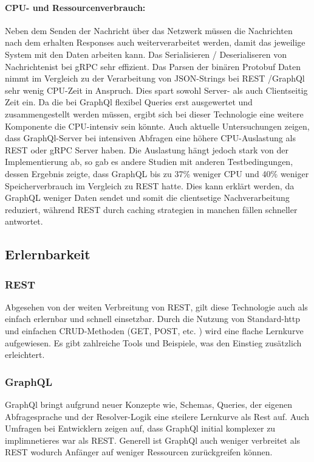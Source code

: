 \paragraph{CPU- und Ressourcenverbrauch:}  
Neben dem Senden der Nachricht über das Netzwerk müssen die Nachrichten nach dem erhalten Responses auch weiterverarbeitet werden, damit das jeweilige System mit den Daten arbeiten kann. Das Serialisieren / Deserialiseren von Nachrichtenist bei gRPC sehr effizient. Das Parsen der binären Protobuf Daten nimmt im Vergleich zu der Verarbeitung von JSON-Strings bei REST /GraphQl sehr wenig CPU-Zeit in Anspruch. Dies spart sowohl Server- als auch Clientseitig Zeit ein. Da die bei GraphQl flexibel Queries erst ausgewertet und zusammengestellt werden müssen,  ergibt sich bei dieser Technologie eine weitere Komponente die CPU-intensiv sein könnte. Auch aktuelle Untersuchungen zeigen, dass GraphQl-Server bei intensiven Abfragen eine höhere CPU-Auslastung als REST oder gRPC Server haben. Die Auslastung hängt jedoch stark von der Implementierung ab, so gab es andere Studien mit anderen Testbedingungen, dessen Ergebnis zeigte, dass GraphQL bis zu 37\% weniger CPU und 40\% weniger Speicherverbrauch im Vergleich zu REST hatte. Dies kann erklärt werden, da GraphQL weniger Daten sendet und somit die clientsetige Nachverarbeitung reduziert, während REST durch caching strategien in manchen fällen schneller antwortet. 

\subsection{Erlernbarkeit}

\subsubsection{REST}
Abgesehen von der weiten Verbreitung von REST, gilt diese Technologie auch als einfach erlernbar und schnell einsetzbar. Durch die Nutzung von Standard-http und einfachen CRUD-Methoden (GET, POST, etc. ) wird eine flache Lernkurve aufgewiesen. Es gibt zahlreiche Tools und Beispiele, was den Einstieg zusätzlich erleichtert.

\subsubsection{GraphQL}
GraphQl bringt aufgrund neuer Konzepte wie, Schemas, Queries, der eigenen Abfragesprache und der Resolver-Logik eine steilere Lernkurve als Rest auf. Auch Umfragen bei Entwicklern zeigen auf, dass GraphQl initial komplexer zu implimnetieres war als REST. Generell ist GraphQl auch weniger verbreitet als REST wodurch Anfänger auf weniger Ressourcen zurückgreifen können.

